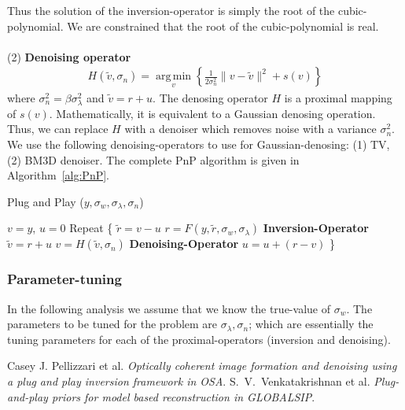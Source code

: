 \documentclass[a4paper, 11pt]{article}
\DeclareMathOperator*{\argmin}{arg\,min}
\begin{document}
Thus the solution of the inversion-operator is simply the root of the cubic-polynomial. We are constrained that the root of the cubic-polynomial is real.  \\ \\
(2) \textbf{Denoising operator} 
\begin{eqnarray*}
H(\tilde{v},\sigma_n)=\underset{v}{\argmin} \left \{ \frac{1}{2\sigma_n^2} \|v-\tilde{v}\|^2 +s(v)\right \} 
\end{eqnarray*}
where $\sigma_n^2=\beta \sigma_\lambda^2$ and $\tilde{v}=r+u$. The denosing operator $H$ is a proximal mapping of $s(v)$. Mathematically, it is equivalent to a Gaussian denosing operation. Thus, we can replace $H$ with a denoiser which removes noise with a variance $\sigma_n^2$. We use the following denoising-operators to use for Gaussian-denosing: (1) TV, (2) BM3D denoiser. The complete PnP algorithm is given in Algorithm~\ref{alg:PnP}. 

\begin{algorithm}
\caption{Plug and Play ($y, \sigma_w,\sigma_\lambda,\sigma_n$)}\label{euclid}
\begin{algorithmic}[1]
\State $v=y$, $u=0$
\State Repeat 
\State \{
\State $\tilde{r}=v-u$
\State $r=F(y,\tilde{r},\sigma_w,\sigma_\lambda)$ \quad \textbf{Inversion-Operator}
\State $\tilde{v}=r+u$
\State $v=H(\tilde{v},\sigma_n)$ \quad \textbf{Denoising-Operator}
\State $u=u+(r-v)$
\State \}
\end{algorithmic}
\label{alg:PnP}
\end{algorithm}

\subsubsection{Parameter-tuning}
In the following analysis we assume that we know the true-value of $\sigma_w$. The parameters to be tuned for the problem are $\sigma_\lambda, \sigma_n$; which are essentially the tuning parameters for each of the proximal-operators (inversion and denoising). 

\begin{thebibliography}{9}
 Casey J. Pellizzari et al. \emph{Optically coherent image formation and denoising using a plug and play inversion framework in OSA}.
 S.~V.~Venkatakrishnan et al. \emph{Plug-and-play priors for model based reconstruction in GLOBALSIP}.
\end{thebibliography}
\end{document}
